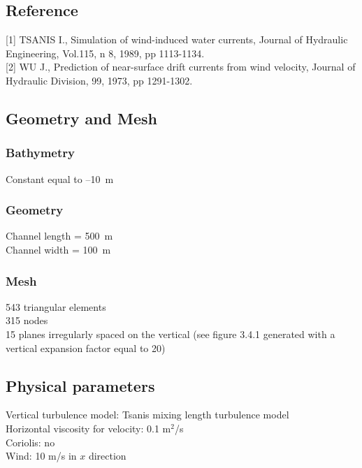 \subsection{Reference}
%
[1] TSANIS I., Simulation of wind-induced water currents,
Journal of Hydraulic Engineering, Vol.115, n 8, 1989, pp 1113-1134.\\

[2] WU J., Prediction of near-surface drift currents from wind velocity,
Journal of Hydraulic Division, 99, 1973, pp 1291-1302.
%
%
%
\subsection{Geometry and Mesh}
%
\subsubsection{Bathymetry}
%
Constant equal to –10~m
%
\subsubsection{Geometry}
%
Channel length = 500~m\\
Channel width = 100~m
%
\subsubsection{Mesh}
%
543 triangular elements\\
315 nodes\\
15 planes irregularly spaced on the vertical (see figure 3.4.1
generated with a vertical expansion factor equal to 20)
%
%
%
\subsection{Physical parameters}
%
Vertical turbulence model: Tsanis mixing length turbulence model\\
Horizontal viscosity for velocity: 0.1 m$^2$/s\\
Coriolis: no\\
Wind: 10 m/s in $x$ direction
%
%
%
%
%
%
